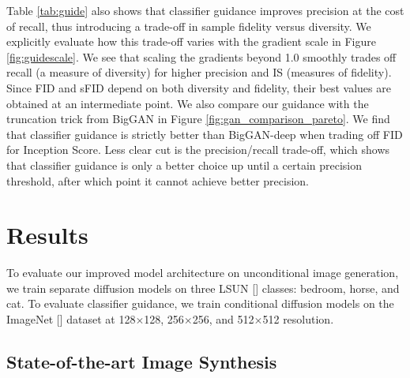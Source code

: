 \documentclass{article}
\newcommand{\shortcite}[1]{[\citenum{#1}]}
\begin{document}
Table \ref{tab:guide} also shows that classifier guidance improves precision at the cost of recall, thus introducing a trade-off in sample fidelity versus diversity. We explicitly evaluate how this trade-off varies with the gradient scale in Figure \ref{fig:guidescale}. We see that scaling the gradients beyond 1.0 smoothly trades off recall (a measure of diversity) for higher precision and IS (measures of fidelity). Since FID and sFID depend on both diversity and fidelity, their best values are obtained at an intermediate point. We also compare our guidance with the truncation trick from BigGAN in Figure \ref{fig:gan_comparison_pareto}. We find that classifier guidance is strictly better than BigGAN-deep when trading off FID for Inception Score. Less clear cut is the precision/recall trade-off, which shows that classifier guidance is only a better choice up until a certain precision threshold, after which point it cannot achieve better precision.

\section{Results}
\label{sec:results}
To evaluate our improved model architecture on unconditional image generation, we train separate diffusion models on three LSUN \shortcite{lsun} classes: bedroom, horse, and cat. To evaluate classifier guidance, we train conditional diffusion models on the ImageNet \shortcite{imagenet} dataset at 128$\times$128, 256$\times$256, and 512$\times$512 resolution.

\subsection{State-of-the-art Image Synthesis}
\end{document}
